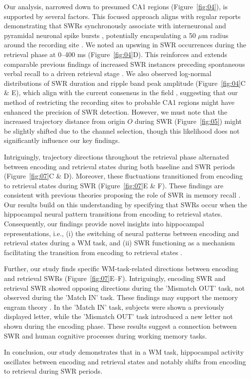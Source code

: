 Our analysis, narrowed down to presumed CA1 regions (Figure~\ref{fig:04}), is supported by several factors. This focused approach aligns with regular reports demonstrating that SWRs synchronously associate with interneuronal and pyramidal neuronal spike bursts \cite{buzsaki_two-stage_1989,quyen_cell_2008,royer_control_2012,hajos_input-output_2013}, potentially encapsulating a 50 $\mu$m radius around the recording site \cite{schomburg_spiking_2012}. We noted an upswing in SWR occurrences during the retrieval phase at 0--400 ms (Figure~\ref{fig:04}D). This reinforces and extends comparable previous findings of increased SWR instances preceding spontaneous verbal recall to a driven retrieval stage \cite{norman_hippocampal_2019, norman_hippocampal_2021}. We also observed log-normal distributions of SWR duration and ripple band peak amplitude (Figure~\ref{fig:04}C \& E), which align with the current consensus in the field \cite{liu_consensus_2022}, suggesting that our method of restricting the recording sites to probable CA1 regions might have enhanced the precision of SWR detection. However, we must note that the increased trajectory distance from origin $O$ during SWR (Figure~\ref{fig:05}) might be slightly shifted due to the channel selection, though this likelihood does not significantly influence our key findings.

Intriguingly, trajectory directions throughout the retrieval phase alternated between encoding and retrieval states during both baseline and SWR periods (Figure~\ref{fig:07}C \& D). Moreover, these fluctuations transitioned from encoding to retrieval states during SWR (Figure~\ref{fig:07}E \& F). These findings are consistent with previous theories proposing the role of SWR in memory recall \cite{norman_hippocampal_2019, norman_hippocampal_2021}. Our results build on this understanding by specifying that SWRs occur when the hippocampal neural pattern transitions from encoding to retrieval states. Consequently, our findings provide novel insights into hippocampal representations, i.e., (i) the switching of neural patterns between encoding and retrieval states during a WM task, and (ii) SWR functioning as a mechanism facilitating the transition from encoding to retrieval states \cite{buzsaki_hippocampal_2015}.

Further, our study finds specific WM-task-related directions between encoding and retrieval SWRs (Figure~\ref{fig:07}E--F). Intriguingly, encoding SWR and retrieval SWR showed opposing directions during the 'Mismatch OUT' task, not observed during the 'Match IN' task. These findings may support the memory engram theory \cite{liu_optogenetic_2012}. In the 'Match IN' task, subjects were shown a previously displayed letter, while the 'Mismatch OUT' task introduced a new letter not shown during the encoding phase. These results suggest a connection between SWR and human cognitive processes during working memory tasks.

In conclusion, our study demonstrates that in a WM task, hippocampal activity oscillates between encoding and retrieval states and notably shifts from encoding to retrieval during SWR periods.

\label{sec:discussion}